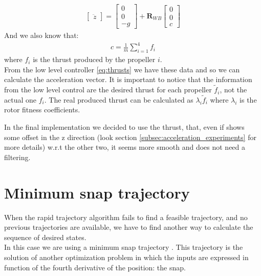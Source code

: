 \begin{itemize}
\begin{align}
{\begin{bmatrix}
\ddot{z}
\end{bmatrix}}=
{\begin{bmatrix}
0 \\[10pt]
0 \\[10pt]
-g
\end{bmatrix}} 
+ \boldsymbol{R}_{WB}
{\begin{bmatrix}
0 \\[10pt]
0 \\[10pt]
c
\end{bmatrix}}
\end{align}
And we also know that:
 \begin{align}
c = \frac{1}{m}\sum_{i=1}^{4}{f_i}
\end{align}
where $f_i$ is the thrust produced by the propeller $i$.\\
From the low level controller \ref{eq:thrusts} we have these data and so we can calculate the acceleration vector. It is important to notice that the information from the low level control are the desired thrust for each propeller $\tilde{f}_i$, not the actual one $f_i$. The real produced thrust can be calculated as $\lambda_i\tilde{f}_i$ where $\lambda_i$ is the rotor fitness coefficients.\\
\end{itemize}


In the final implementation we decided to use the thrust, that, even if shows some offset in the z direction (look section \ref{subsec:acceleration_experiments} for more details) w.r.t the other two, it seems more smooth and does not need a filtering.


\section{Minimum snap trajectory}
When the rapid trajectory algorithm fails to find a feasible trajectory, and no previous trajectories are available, we have to find another way to calculate the sequence of desired states.\\
In this case we are using a minimum snap trajectory \cite{mellinger2011minimum}. This trajectory is the solution of another optimization problem in which the inputs are expressed in function of the fourth derivative of the position: the snap.\\

